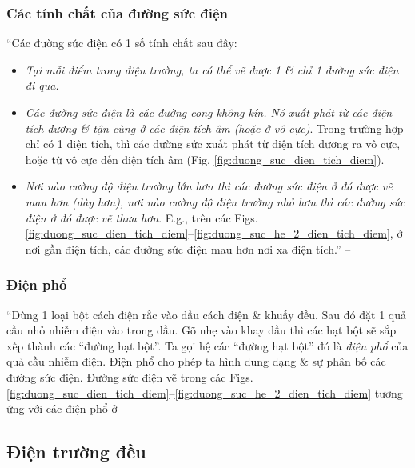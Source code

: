 \documentclass[oneside]{book}
\numberwithin{equation}{section}
\begin{document}
\subsubsection{Các tính chất của đường sức điện}
``Các đường sức điện có 1 số tính chất sau đây:
\begin{itemize}
	\item \textit{Tại mỗi điểm trong điện trường, ta có thể vẽ được 1 \& chỉ 1 đường sức điện đi qua.}
	\item \textit{Các đường sức điện là các đường cong không kín. Nó xuất phát từ các điện tích dương \& tận cùng ở các điện tích âm (hoặc ở vô cực)}. Trong trường hợp chỉ có 1 điện tích, thì các đường sức xuất phát từ điện tích dương ra vô cực, hoặc từ vô cực đến điện tích âm (Fig. \ref{fig:duong_suc_dien_tich_diem}).
	\item \textit{Nơi nào cường độ điện trường lớn hơn thì các đường sức điện ở đó được vẽ mau hơn (dày hơn), nơi nào cường độ điện trường nhỏ hơn thì các đường sức điện ở đó được vẽ thưa hơn}. E.g., trên các Figs. \ref{fig:duong_suc_dien_tich_diem}--\ref{fig:duong_suc_he_2_dien_tich_diem}, ở nơi gần điện tích, các đường sức điện mau hơn nơi xa điện tích.'' --  \cite[p. 15]{SGK_Vat_Ly_11_nang_cao}
\end{itemize}

\subsubsection{Điện phổ}
``Dùng 1 loại bột cách điện rắc vào dầu cách điện \& khuấy đều. Sau đó đặt 1 quả cầu nhỏ nhiễm điện vào trong dầu. Gõ nhẹ vào khay dầu thì các hạt bột sẽ sắp xếp thành các ``đường hạt bột''. Ta gọi hệ các ``đường hạt bột'' đó là \textit{điện phổ} của quả cầu nhiễm điện. Điện phổ cho phép ta hình dung dạng \& sự phân bố các đường sức điện. Đường sức điện vẽ trong các Figs. \ref{fig:duong_suc_dien_tich_diem}--\ref{fig:duong_suc_he_2_dien_tich_diem} tương ứng với các điện phổ ở \cite[Hình 3.5: \textsf{Điện phổ của 1 quả cầu nhiễm điện} \& Hình 3.6: \textsf{Điện phổ của 2 quả cầu nhiễm điện cùng \& trái dấu}, p. 16]{SGK_Vat_Ly_11_nang_cao}

\subsection{Điện trường đều}
\end{document}
